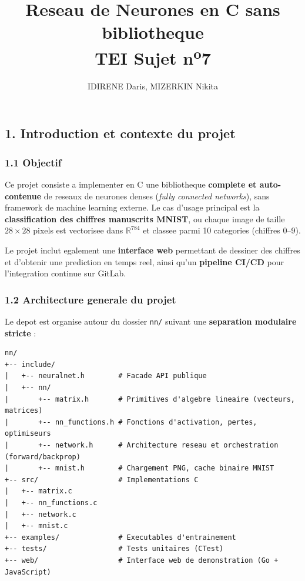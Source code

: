 \documentclass[
  letterpaper,
  DIV=11,
  numbers=noendperiod]{scrartcl}
\title{Reseau de Neurones en C sans bibliotheque \\ TEI Sujet n\textsuperscript{o}7}
\author{IDIRENE Daris, MIZERKIN Nikita}
\date{}
\begin{document}
\maketitle

\tableofcontents
\newpage

\subsection{1. Introduction et contexte du projet}\label{introduction-du-projet}

\subsubsection{1.1 Objectif}\label{objectif}

Ce projet consiste a implementer en C une bibliotheque \textbf{complete et auto-contenue} de reseaux de neurones denses (\emph{fully connected networks}), sans framework de machine learning externe. Le cas d'usage principal est la \textbf{classification des chiffres manuscrits MNIST}, ou chaque image de taille \(28\times 28\) pixels est vectorisee dans \(\mathbb{R}^{784}\) et classee parmi 10 categories (chiffres 0--9).

Le projet inclut egalement une \textbf{interface web} permettant de dessiner des chiffres et d'obtenir une prediction en temps reel, ainsi qu'un \textbf{pipeline CI/CD} pour l'integration continue sur GitLab.

\subsubsection{1.2 Architecture generale du projet}\label{architecture-generale-du-projet}

Le depot est organise autour du dossier \texttt{nn/} suivant une \textbf{separation modulaire stricte} :

\begin{verbatim}
nn/
+-- include/
|   +-- neuralnet.h        # Facade API publique
|   +-- nn/
|       +-- matrix.h       # Primitives d'algebre lineaire (vecteurs, matrices)
|       +-- nn_functions.h # Fonctions d'activation, pertes, optimiseurs
|       +-- network.h      # Architecture reseau et orchestration (forward/backprop)
|       +-- mnist.h        # Chargement PNG, cache binaire MNIST
+-- src/                   # Implementations C
|   +-- matrix.c
|   +-- nn_functions.c
|   +-- network.c
|   +-- mnist.c
+-- examples/              # Executables d'entrainement
+-- tests/                 # Tests unitaires (CTest)
+-- web/                   # Interface web de demonstration (Go + JavaScript)
\end{verbatim}
\end{document}
